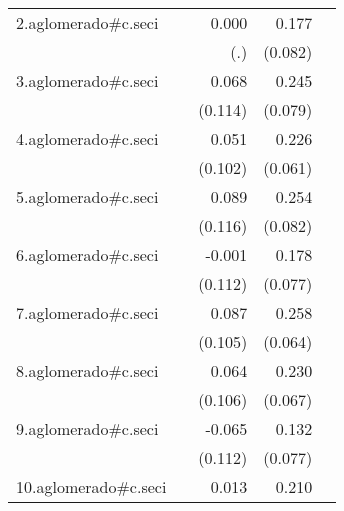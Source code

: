 {\begin{longtable}{l*{4}{D{.}{.}{-1}}}
\addlinespace
2.aglomerado#c.seci&                     &       0.000         &       0.177\sym{*}  &                     \\
            &                     &         (.)         &     (0.082)         &                     \\
\addlinespace
3.aglomerado#c.seci&                     &       0.068         &       0.245\sym{**} &                     \\
            &                     &     (0.114)         &     (0.079)         &                     \\
\addlinespace
4.aglomerado#c.seci&                     &       0.051         &       0.226\sym{***}&                     \\
            &                     &     (0.102)         &     (0.061)         &                     \\
\addlinespace
5.aglomerado#c.seci&                     &       0.089         &       0.254\sym{**} &                     \\
            &                     &     (0.116)         &     (0.082)         &                     \\
\addlinespace
6.aglomerado#c.seci&                     &      -0.001         &       0.178\sym{*}  &                     \\
            &                     &     (0.112)         &     (0.077)         &                     \\
\addlinespace
7.aglomerado#c.seci&                     &       0.087         &       0.258\sym{***}&                     \\
            &                     &     (0.105)         &     (0.064)         &                     \\
\addlinespace
8.aglomerado#c.seci&                     &       0.064         &       0.230\sym{***}&                     \\
            &                     &     (0.106)         &     (0.067)         &                     \\
\addlinespace
9.aglomerado#c.seci&                     &      -0.065         &       0.132         &                     \\
            &                     &     (0.112)         &     (0.077)         &                     \\
\addlinespace
10.aglomerado#c.seci&                     &       0.013         &       0.210\sym{***}&                     \\

\end{longtable}}
